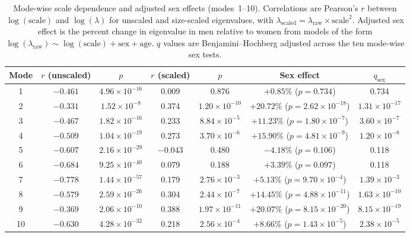 \documentclass[openacc]{rsproca_new}
\begin{document}
\begin{table}[p]
\centering
\caption{Mode-wise scale dependence and adjusted sex effects (modes~1--10). Correlations are Pearson's $r$ between $\log(\mathrm{scale})$ and $\log(\lambda)$ for unscaled and size-scaled eigenvalues, with $\lambda_{\mathrm{scaled}}=\lambda_{\mathrm{raw}}\times\mathrm{scale}^{2}$. Adjusted sex effect is the percent change in eigenvalue in men relative to women from models of the form $\log(\lambda_{\mathrm{raw}}) \sim \log(\mathrm{scale}) + \mathrm{sex} + \mathrm{age}$. $q$ values are Benjamini--Hochberg adjusted across the ten mode-wise sex tests.}
\label{tab:modes}
\scriptsize
\setlength{\tabcolsep}{3pt}
\begin{tabular}{ccccccc}
\toprule
Mode & $r$ (unscaled) & $p$ & $r$ (scaled) & $p$ & Sex effect & $q_{\mathrm{sex}}$ \\
\midrule
1  & $-0.461$ & $4.96 \times 10^{-16}$ & 0.009 & 0.876 & $+0.85\%$ ($p=0.734$) & 0.734 \\
2  & $-0.331$ & $1.52 \times 10^{-8}$  & 0.374 & $1.20 \times 10^{-10}$ & $+20.72\%$ ($p=2.62 \times 10^{-18}$) & $1.31 \times 10^{-17}$ \\
3  & $-0.467$ & $1.82 \times 10^{-16}$ & 0.233 & $8.84 \times 10^{-5}$  & $+11.23\%$ ($p=1.80 \times 10^{-7}$) & $3.60 \times 10^{-7}$ \\
4  & $-0.509$ & $1.04 \times 10^{-19}$ & 0.273 & $3.70 \times 10^{-6}$  & $+15.90\%$ ($p=4.81 \times 10^{-9}$) & $1.20 \times 10^{-8}$ \\
5  & $-0.607$ & $2.16 \times 10^{-29}$ & $-0.043$ & 0.480 & $-4.18\%$ ($p=0.106$) & 0.118 \\
6  & $-0.684$ & $9.25 \times 10^{-40}$ & 0.079 & 0.188 & $+3.39\%$ ($p=0.097$) & 0.118 \\
7  & $-0.778$ & $1.44 \times 10^{-57}$ & 0.179 & $2.76 \times 10^{-3}$  & $+5.13\%$ ($p=9.70 \times 10^{-4}$) & $1.39 \times 10^{-3}$ \\
8  & $-0.579$ & $2.59 \times 10^{-26}$ & 0.304 & $2.44 \times 10^{-7}$  & $+14.45\%$ ($p=4.88 \times 10^{-11}$) & $1.63 \times 10^{-10}$ \\
9  & $-0.369$ & $2.06 \times 10^{-10}$ & 0.388 & $1.97 \times 10^{-11}$ & $+20.07\%$ ($p=8.15 \times 10^{-20}$) & $8.15 \times 10^{-19}$ \\
10 & $-0.630$ & $4.28 \times 10^{-32}$ & 0.218 & $2.56 \times 10^{-4}$  & $+8.66\%$ ($p=1.43 \times 10^{-5}$) & $2.38 \times 10^{-5}$ \\
\bottomrule
\end{tabular}
\end{table}
\end{document}
